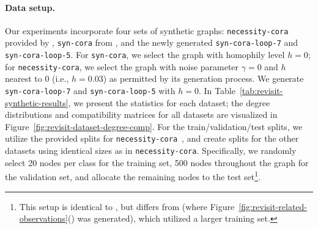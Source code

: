 \paragraph{Data setup.}
Our experiments incorporate four sets of synthetic graphs: \texttt{necessity-cora} provided by \citet{ma2021homophily}, \texttt{syn-cora} from \cite{zhu2020beyond}, and the newly generated \texttt{syn-cora-loop-7} and \texttt{syn-cora-loop-5}.
For \texttt{syn-cora}, we select the graph with homophily level $h=0$; for \texttt{necessity-cora}, we select the graph with noise parameter $\gamma=0$ and $h$ nearest to 0 (i.e., $h=0.03$) as permitted by its generation process. 
We generate \texttt{syn-cora-loop-7} and \texttt{syn-cora-loop-5} with $h=0$. In Table~\ref{tab:revisit-synthetic-results}, we present the statistics for each dataset; the degree distributions and compatibility matrices for all datasets are visualized in Figure~\ref{fig:revisit-dataset-degree-comp}.
For the train/validation/test splits, we utilize the provided splits for \texttt{necessity-cora}~\cite{ma2021homophily}, and create splits for the other datasets using identical sizes as in \texttt{necessity-cora}. Specifically, we randomly select 20 nodes per class for the training set, 500 nodes throughout the graph for the validation set, and allocate the remaining nodes to the test set\footnote{This setup is identical to \cite{kipf2016semi}, but differs from \cite{zhu2020beyond,zhu2021graph} (where Figure~\ref{fig:revisit-related-observations}() was generated), which utilized a larger training set.}.

